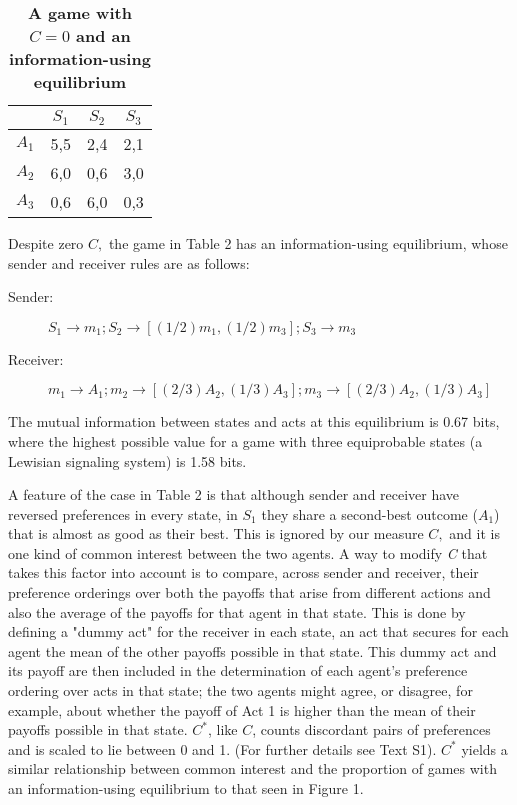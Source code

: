 \documentclass[10pt]{article}
\begin{document}
\begin{table}[!ht]
\caption{
\bf{A game with $C=0$ and an information-using equilibrium}}
\begin{tabular}{|c||c|c|c|}
& $S_{1}$ & $S_{2}$ & $S_{3}$ \\
\hline
$A_{1}$ & 5,5 & 2,4 & 2,1 \\
$A_{2}$ & 6,0 & 0,6 & 3,0 \\
$A_{3}$ & 0,6 & 6,0 & 0,3 \\
\end{tabular}
\begin{flushleft}
\end{flushleft}
\label{tab:label}
 \end{table}

Despite zero $C,$ the game in Table 2 has an information-using
equilibrium, whose sender and receiver rules are as follows:

\begin{description}
\item[Sender:]
$S_1\rightarrow m_1;S_2\rightarrow [(1/2)m_1, (1/2)m_3]; S_3\rightarrow m_3$
\item[Receiver:]
$m_1\rightarrow A_1; m_2\rightarrow [(2/3)A_2, (1/3)A_3]; m_3\rightarrow [(2/3)A_2, (1/3)A_3]$
\end{description}

The mutual information between states and acts at this equilibrium is
0.67 bits, where the highest possible value for a game with three
equiprobable states (a Lewisian signaling system) is 1.58 bits.

A feature of the case in Table 2 is that although sender and receiver
have reversed preferences in every state, in $S_1$ they share a second-best
outcome ($A_1$) that is almost as good as their best. This is ignored by
our measure $C,$ and it is one kind of common interest between the two
agents. A way to modify \emph{C} that takes this factor into account is
to compare, across sender and receiver, their preference orderings over
both the payoffs that arise from different actions and also the average
of the payoffs for that agent in that state. This is done by defining a "dummy act" for the receiver in each state, an act that secures for each agent the mean of the other payoffs possible in that state. This dummy act and its payoff are then included in the determination of each agent's preference ordering over acts in that state; the two agents might agree, or disagree, for example, about whether the payoff of Act 1 is higher than the mean of their payoffs possible in that state. $C^*$, like $C$, counts discordant pairs of preferences and is scaled to lie between 0 and 1. (For further details see Text S1).  $C^*$ yields
a similar relationship between common interest and the proportion of
games with an information-using equilibrium to that seen in Figure 1.
\end{document}
